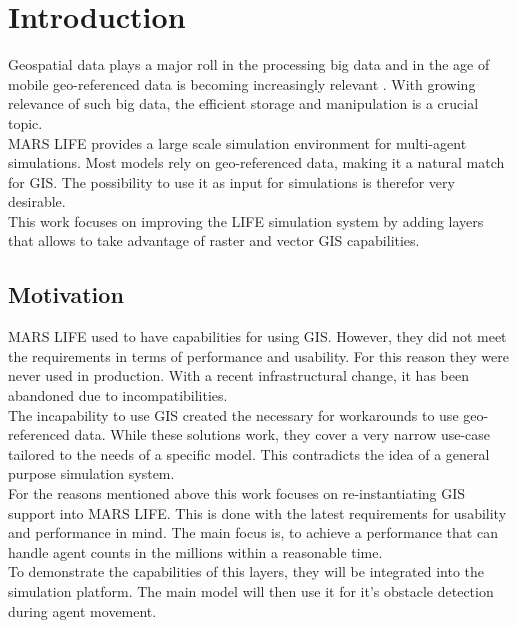 
\chapter{Introduction}
Geospatial data plays a major roll in the processing big data and in the age of mobile geo-referenced data is becoming increasingly relevant \citep{Lee2015, Kitchin2013, Graham2013}. With growing relevance of such big data, the efficient storage and manipulation is a crucial topic.\\
MARS LIFE provides a large scale simulation environment for multi-agent simulations. Most models rely on geo-referenced data, making it a natural match for GIS. The possibility to use it as input for simulations is therefor very desirable.\\
This work focuses on improving the LIFE simulation system by adding layers that allows to take advantage of raster and vector GIS capabilities.



\section{Motivation}
MARS LIFE used to have capabilities for using GIS. However, they did not meet the requirements in terms of performance and usability. For this reason they were never used in production. With a recent infrastructural change, it has been abandoned due to incompatibilities.\\
The incapability to use GIS created the necessary for workarounds to use geo-referenced data. While these solutions work, they cover a very narrow use-case tailored to the needs of a specific model. This contradicts the idea of a general purpose simulation system.\\
For the reasons mentioned above this work focuses on re-instantiating GIS support into MARS LIFE. This is done with the latest requirements for usability and performance in mind. The main focus is, to achieve a performance that can handle agent counts in the millions within a reasonable time.\\
To demonstrate the capabilities of this layers, they will be integrated into the simulation platform. The main model will then use it for it's obstacle detection during agent movement.
